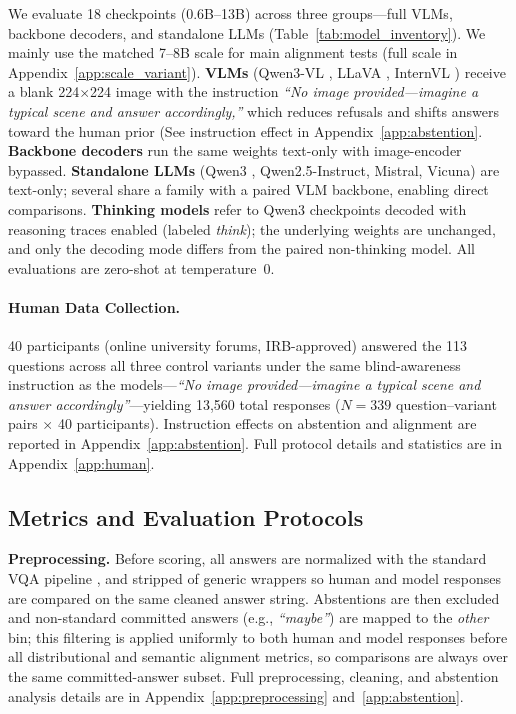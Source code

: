 \documentclass[letterpaper]{article}
\begin{document}
We evaluate 18 checkpoints (0.6B--13B) across three groups---full VLMs, backbone decoders, and standalone LLMs (Table~\ref{tab:model_inventory}). We mainly use the matched 7--8B scale for main alignment tests (full scale in Appendix~\ref{app:scale_variant}).
\textbf{VLMs} (Qwen3-VL \citep{bai2025qwen3vl}, LLaVA \citep{liu2023visual,liu2024llavanext}, InternVL \citep{zhu2025internvl3}) receive a blank 224$\times$224 image with the instruction \textit{``No image provided---imagine a typical scene and answer accordingly,''} which reduces refusals and shifts answers toward the human prior (See instruction effect in Appendix~\ref{app:abstention}. 
\textbf{Backbone decoders} run the same weights text-only with image-encoder bypassed. %
\textbf{Standalone LLMs} (Qwen3 \citep{yang2025qwen3}, Qwen2.5-Instruct, Mistral, Vicuna) are text-only; several share a family with a paired VLM backbone, enabling direct comparisons.
\textbf{Thinking models} refer to Qwen3 checkpoints decoded with reasoning traces enabled (labeled \textit{think}); the underlying weights are unchanged, and only the decoding mode differs from the paired non-thinking model.
All evaluations are zero-shot at temperature~0.

\paragraph{Human Data Collection.}\label{sec:human_data}
40 participants (online university forums, IRB-approved) answered the 113 questions across all three control variants under the same blind-awareness instruction as the models---\textit{``No image provided---imagine a typical scene and answer accordingly''}---yielding 13,560 total responses ($N{=}339$ question--variant pairs $\times$ 40 participants).
Instruction effects on abstention and alignment are reported in Appendix~\ref{app:abstention}.
Full protocol details and statistics are in Appendix~\ref{app:human}.

\subsection{Metrics and Evaluation Protocols}
\label{sec:eval_protocols}

\textbf{Preprocessing.} Before scoring, all answers are normalized with the standard VQA pipeline
\citep{antol2015vqa}, and stripped of generic wrappers so human and model
responses are compared on the same cleaned answer string.
Abstentions are then excluded and non-standard committed answers (e.g., \textit{``maybe''}) are mapped to the \textit{other} bin; this filtering is applied uniformly to both human and model responses before all distributional and semantic alignment metrics, so comparisons are always over the same committed-answer subset.
Full preprocessing, cleaning, and abstention analysis details are in Appendix~\ref{app:preprocessing} and~\ref{app:abstention}.
\end{document}
